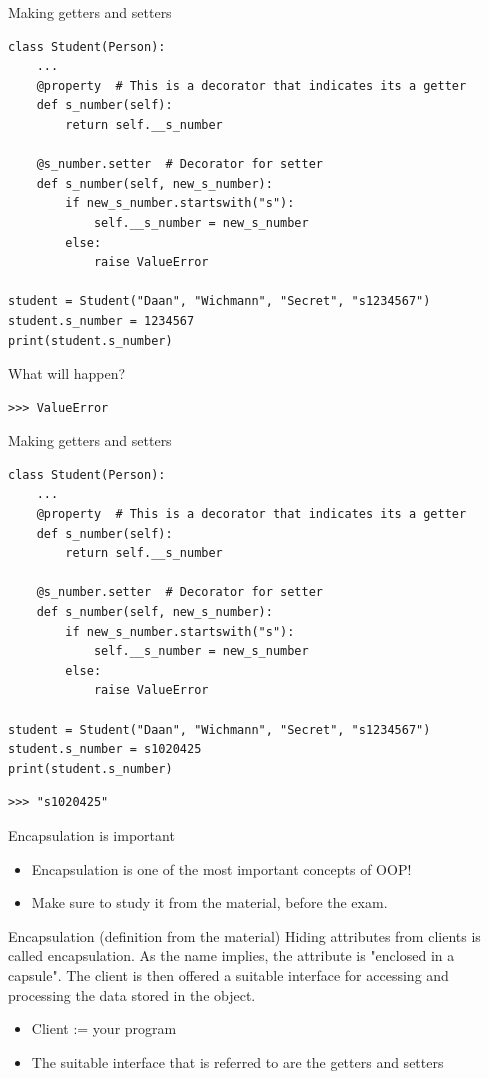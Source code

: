 \begin{frame}[fragile]{Making getters and setters}
\begin{verbatim}
class Student(Person):
    ...
    @property  # This is a decorator that indicates its a getter
    def s_number(self):
        return self.__s_number

    @s_number.setter  # Decorator for setter
    def s_number(self, new_s_number):
        if new_s_number.startswith("s"):
            self.__s_number = new_s_number
        else:
            raise ValueError

student = Student("Daan", "Wichmann", "Secret", "s1234567")
student.s_number = 1234567
print(student.s_number)
\end{verbatim}
What will happen?
\pause
\begin{verbatim}
>>> ValueError
\end{verbatim}
\end{frame}

\begin{frame}[fragile]{Making getters and setters}
\begin{verbatim}
class Student(Person):
    ...
    @property  # This is a decorator that indicates its a getter
    def s_number(self): 
        return self.__s_number

    @s_number.setter  # Decorator for setter
    def s_number(self, new_s_number):
        if new_s_number.startswith("s"):
            self.__s_number = new_s_number
        else:
            raise ValueError

student = Student("Daan", "Wichmann", "Secret", "s1234567")
student.s_number = s1020425
print(student.s_number)
\end{verbatim}
\pause
\begin{verbatim}
>>> "s1020425"
\end{verbatim}
\end{frame}

\begin{frame}{Encapsulation is important}
\begin{itemize}
    \item Encapsulation is one of the most important concepts of OOP!
    \pause
    \item Make sure to study it from the material, before the exam.
\end{itemize}
\pause
\begin{block}{Encapsulation (definition from the material)}
    Hiding attributes from clients is called encapsulation. As the name implies, the attribute is "enclosed in a capsule". The client is then offered a suitable interface for accessing and processing the data stored in the object.
\end{block}
\pause
\begin{itemize}
    \item Client := your program
    \item The suitable interface that is referred to are the getters and setters
\end{itemize}
\end{frame}